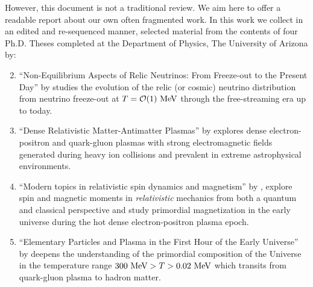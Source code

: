 However, this document is not a traditional review. We aim here to offer a readable report about our own often fragmented work. In this work we collect in an edited and re-sequenced manner, selected material from the contents of four Ph.D. Theses completed at the Department of Physics, The University of Arizona by:
\begin{enumerate}
\setcounter{enumi}{1}
\item ``Non-Equilibrium Aspects of Relic Neutrinos: From Freeze-out to the Present Day'' by  studies the evolution of the relic (or cosmic) neutrino distribution from neutrino freeze-out at $T=\mathcal{O}(1)\text{ MeV}$ through the free-streaming era up to today.
%
\item ``Dense Relativistic Matter-Antimatter Plasmas'' by  explores dense electron-positron and quark-gluon plasmas with strong electromagnetic fields generated during heavy ion collisions and prevalent in extreme astrophysical environments.
%
\item ``Modern topics in relativistic spin dynamics and magnetism'' by , explore spin and magnetic moments in \emph{relativistic} mechanics from both a quantum and classical perspective and study primordial magnetization in the early universe during the hot dense electron-positron plasma epoch.
%
\item ``Elementary Particles and Plasma in the First Hour of the Early Universe'' by  deepens the understanding of the primordial composition of the Universe in the temperature range $300 \text{ MeV}>T>0.02\text{ MeV}$ which transits from quark-gluon plasma to hadron matter.
\end{enumerate}

